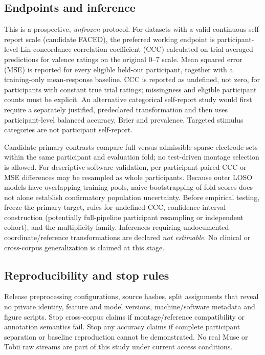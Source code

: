\subsection{Endpoints and inference}
This is a prospective, \emph{unfrozen} protocol. For datasets with a valid continuous self-report scale (candidate FACED), the preferred working endpoint is participant-level Lin concordance correlation coefficient (CCC) calculated on trial-averaged predictions for valence ratings on the original 0--7 scale. Mean squared error (MSE) is reported for every eligible held-out participant, together with a training-only mean-response baseline. CCC is reported as undefined, not zero, for participants with constant true trial ratings; missingness and eligible participant counts must be explicit. An alternative categorical self-report study would first require a separately justified, predeclared transformation and then uses participant-level balanced accuracy, Brier and prevalence. Targeted stimulus categories are not participant self-report.

Candidate primary contrasts compare full versus admissible sparse electrode sets within the same participant and evaluation fold; no test-driven montage selection is allowed. For descriptive software validation, per-participant paired CCC or MSE differences may be resampled as whole participants. Because outer LOSO models have overlapping training pools, naive bootstrapping of fold scores does not alone establish confirmatory population uncertainty. Before empirical testing, freeze the primary target, rules for undefined CCC, confidence-interval construction (potentially full-pipeline participant resampling or independent cohort), and the multiplicity family. Inferences requiring undocumented coordinate/reference transformations are declared \emph{not estimable}. No clinical or cross-corpus generalization is claimed at this stage.

\subsection{Reproducibility and stop rules}
Release preprocessing configurations, source hashes, split assignments that reveal no private identity, feature and model versions, machine/software metadata and figure scripts. Stop cross-corpus claims if montage/reference compatibility or annotation semantics fail. Stop any accuracy claims if complete participant separation or baseline reproduction cannot be demonstrated. No real Muse or Tobii raw streams are part of this study under current access conditions.
